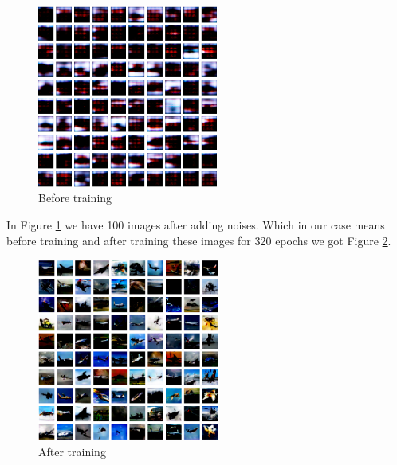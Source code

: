 \documentclass[10pt,twocolumn,letterpaper]{article}
\begin{document}
\begin{figure}[h]
    \centering
    \includegraphics[width=1\columnwidth,height=6cm]{images/Before.png}
    \caption{ Before training}
    \label{fig: before_training}
\end{figure}

In Figure \ref{fig: before_training} we have 100 images after adding noises. Which in our case means before training and after training these images for 320 epochs we got Figure \ref{fig: after_training}.

\begin{figure}[h]
    \centering
    \includegraphics[width=1\columnwidth,height=6cm]{images/After.png}
    \caption{ After training}
    \label{fig: after_training}
\end{figure}
{\small


}
\end{document}
